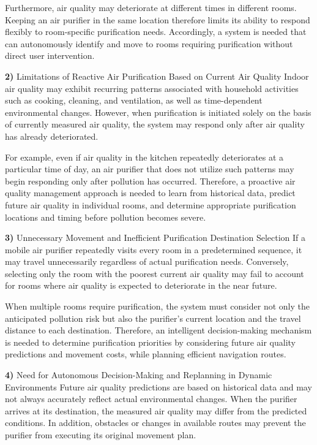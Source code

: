 \documentclass[conference]{IEEEtran}
\begin{document}
Furthermore, air quality may deteriorate at different times in different rooms. Keeping an air purifier in the same location therefore limits its ability to respond flexibly to room-specific purification needs. Accordingly, a system is needed that can autonomously identify and move to rooms requiring purification without direct user intervention.

\par\noindent\textbf{2)} Limitations of Reactive Air Purification Based on Current Air Quality
Indoor air quality may exhibit recurring patterns associated with household activities such as cooking, cleaning, and ventilation, as well as time-dependent environmental changes. However, when purification is initiated solely on the basis of currently measured air quality, the system may respond only after air quality has already deteriorated.

For example, even if air quality in the kitchen repeatedly deteriorates at a particular time of day, an air purifier that does not utilize such patterns may begin responding only after pollution has occurred. Therefore, a proactive air quality management approach is needed to learn from historical data, predict future air quality in individual rooms, and determine appropriate purification locations and timing before pollution becomes severe.

\par\noindent\textbf{3)} Unnecessary Movement and Inefficient Purification Destination Selection
If a mobile air purifier repeatedly visits every room in a predetermined sequence, it may travel unnecessarily regardless of actual purification needs. Conversely, selecting only the room with the poorest current air quality may fail to account for rooms where air quality is expected to deteriorate in the near future.

When multiple rooms require purification, the system must consider not only the anticipated pollution risk but also the purifier's current location and the travel distance to each destination. Therefore, an intelligent decision-making mechanism is needed to determine purification priorities by considering future air quality predictions and movement costs, while planning efficient navigation routes.

\par\noindent\textbf{4)} Need for Autonomous Decision-Making and Replanning in Dynamic Environments
Future air quality predictions are based on historical data and may not always accurately reflect actual environmental changes. When the purifier arrives at its destination, the measured air quality may differ from the predicted conditions. In addition, obstacles or changes in available routes may prevent the purifier from executing its original movement plan.
\end{document}
